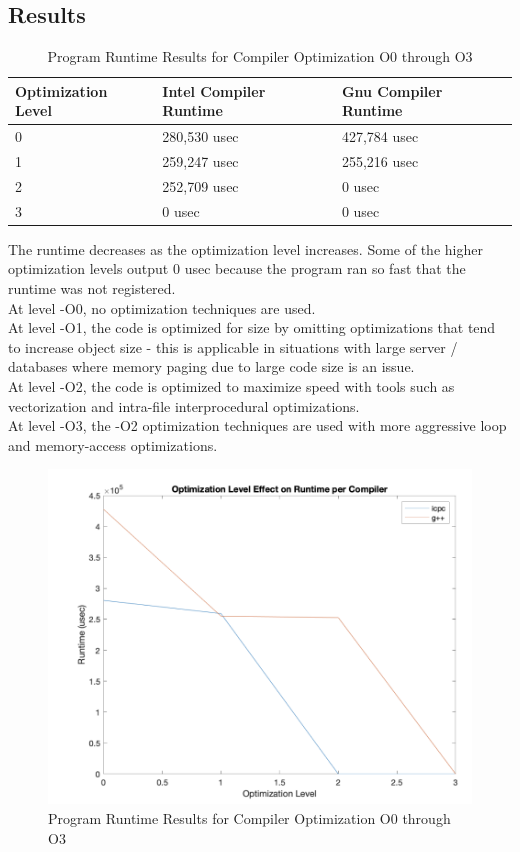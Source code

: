 \documentclass{report}
\begin{document}
\subsection*{Results}

\begin{table}[H]
\centering
\begin{tabular}{|l|l|l|}
\hline
\textbf{Optimization Level} & \textbf{Intel Compiler Runtime} & \textbf{Gnu Compiler Runtime} \\ \hline
0 & 280,530 usec & 427,784 usec \\ \hline
1 & 259,247 usec & 255,216 usec \\ \hline
2 & 252,709 usec & 0 usec \\ \hline
3 & 0 usec & 0 usec \\ \hline
\end{tabular}
\caption{Program Runtime Results for Compiler Optimization O0 through O3}
\label{tab:table1}
\end{table}

The runtime decreases as the optimization level increases. Some of the higher optimization levels output 0 usec because the program ran so fast that the runtime was not registered.  
\\At level -O0, no optimization techniques are used. 
\\At level -O1, the code is optimized for size by omitting optimizations that tend to increase object size - this is applicable in situations with large server / databases where memory paging due to large code size is an issue.
\\At level -O2, the code is optimized to maximize speed with tools such as vectorization and intra-file interprocedural optimizations.
\\At level -O3, the -O2 optimization techniques are used with more aggressive loop and memory-access optimizations.

\begin{figure}[H]
\centering
\includegraphics[width=.5\paperwidth]{optimization_graph.png}
\caption{Program Runtime Results for Compiler Optimization O0 through O3}
\end{figure}
\end{document}
